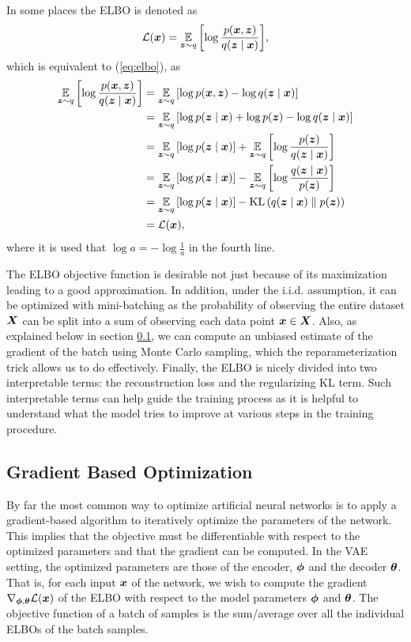 In some places the ELBO is denoted as
\[ \mathcal{L}(\bm{ x }) = \operatorname*{\mathbb{E}}_{\bm{ z }\sim q}{\mathopen{} \left[ \log \frac{p(\bm{ x }, \bm{ z })}{q(\bm{ z } \mid \bm{ x })} \right] \mathclose{}},\]
which is equivalent to (\ref{eq:elbo}), as
\begin{align*}
    \operatorname*{\mathbb{E}}_{\bm{ z }\sim q}{\mathopen{} \left[ \log \frac{p(\bm{ x }, \bm{ z })}{q(\bm{ z } \mid \bm{ x })} \right] \mathclose{}} &= \operatorname*{\mathbb{E}}_{\bm{ z }\sim q}{\mathopen{} \left[ \log p(\bm{ x }, \bm{ z }) - \log q(\bm{ z } \mid \bm{ x }) \right] \mathclose{}}\\
    &= \operatorname*{\mathbb{E}}_{\bm{ z }\sim q}{\mathopen{} \left[ \log p(\bm{ z } \mid \bm{ x }) + \log p(\bm{ z }) - \log q(\bm{ z } \mid \bm{ x }) \right] \mathclose{}}\\
    &= \operatorname*{\mathbb{E}}_{\bm{ z }\sim q}{\mathopen{} \left[ \log p(\bm{ z } \mid \bm{ x }) \right] \mathclose{}} + \operatorname*{\mathbb{E}}_{\bm{ z }\sim q}{\mathopen{} \left[ \log \frac{p(\bm{ z })}{q(\bm{ z } \mid \bm{ x })} \right] \mathclose{}}\\
    &= \operatorname*{\mathbb{E}}_{\bm{ z }\sim q}{\mathopen{} \left[ \log p(\bm{ z } \mid \bm{ x }) \right] \mathclose{}} - \operatorname*{\mathbb{E}}_{\bm{ z }\sim q}{\mathopen{} \left[ \log \frac{q(\bm{ z } \mid \bm{ x })}{p(\bm{ z })} \right] \mathclose{}}\\
    &= \operatorname*{\mathbb{E}}_{\bm{ z }\sim q}{\mathopen{} \left[ \log p(\bm{ z } \mid \bm{ x }) \right] \mathclose{}} - \operatorname{KL}{\mathopen{} \left(q(\bm{ z } \mid \bm{ x }) \parallel p(\bm{ z })\right) \mathclose{}}\\
    &= \mathcal{L}(\bm{ x }),
\end{align*}
where it is used that $\log a = - \log \frac{1}{a}$ in the fourth line.

The ELBO objective function is desirable not just because of its maximization leading to a good approximation. In addition, under the i.i.d. assumption, it can be optimized with mini-batching as the probability of observing the entire dataset $\bm{ X }$ can be split into a sum of observing each data point $\bm{ x } \in \bm{ X }$. Also, as explained below in section \ref{sec:gradient_based_optimization}, we can compute an unbiased estimate of the gradient of the batch using Monte Carlo sampling, which the reparameterization trick allows us to do effectively. Finally, the ELBO is nicely divided into two interpretable terms: the reconstruction loss and the regularizing KL term. Such interpretable terms can help guide the training process as it is helpful to understand what the model tries to improve at various steps in the training procedure.

\subsection{Gradient Based Optimization}
\label{sec:gradient_based_optimization}
By far the most common way to optimize artificial neural networks is to apply a gradient-based algorithm to iteratively optimize the parameters of the network. This implies that the objective must be differentiable with respect to the optimized parameters and that the gradient can be computed. In the VAE setting, the optimized parameters are those of the encoder, $\bm{ \phi }$ and the decoder $\bm{ \theta }$. That is, for each input $\bm{ x }$ of the network, we wish to compute the gradient $\nabla_{\bm{ \phi }, \bm{ \theta }} \mathcal{L}(\bm{ x })$ of the ELBO with respect to the model parameters $\bm{ \phi }$ and $\bm{ \theta }$. The objective function of a batch of samples is the sum/average over all the individual ELBOs of the batch samples.

